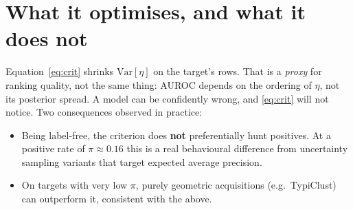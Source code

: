 \documentclass[11pt]{article}
\newcommand{\Var}{\mathrm{Var}}
\begin{document}
\section{What it optimises, and what it does not}

Equation~\eqref{eq:crit} shrinks $\Var[\eta]$ on the target's rows. That is a \emph{proxy} for
ranking quality, not the same thing: AUROC depends on the ordering of $\eta$, not its posterior
spread. A model can be confidently wrong, and \eqref{eq:crit} will not notice. Two consequences
observed in practice:
\begin{itemize}
  \item Being label-free, the criterion does \textbf{not} preferentially hunt positives. At a
        positive rate of $\pi \approx 0.16$ this is a real behavioural difference from
        uncertainty sampling variants that target expected average precision.
  \item On targets with very low $\pi$, purely geometric acquisitions (e.g.\ TypiClust) can
        outperform it, consistent with the above.
\end{itemize}
\end{document}
